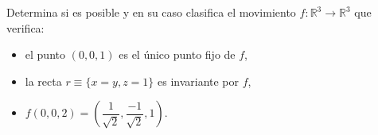 \documentclass[12pt]{article}
\begin{document}
    \begin{ejercicio}[4 puntos]
        Determina si es posible y en su caso clasifica el movimiento $f:\mathbb{R}^3\rightarrow\mathbb{R}^3$ que verifica:
        \begin{itemize}
            \item el punto $(0,0,1)$ es el único punto fijo de $f$,
            \item la recta $r\equiv \{x=y,z=1\}$ es invariante por $f$,
            \item $f(0,0,2) = \left(\dfrac{1}{\sqrt{2}}, \dfrac{-1}{\sqrt{2}},1\right)$.
        \end{itemize}
    \end{ejercicio}
     
\end{document}
